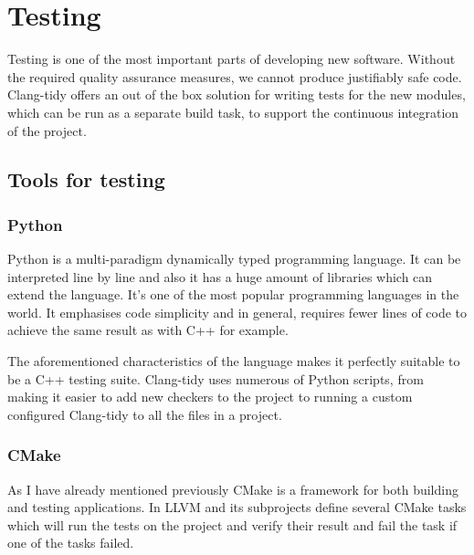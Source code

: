 \section{Testing}
\par Testing is one of the most important parts of developing new software. Without the required quality assurance measures, we cannot produce justifiably safe code. Clang-tidy offers an out of the box solution for writing tests for the new modules, which can be run as a separate build task, to support the continuous integration of the project.
\subsection{Tools for testing}
\subsubsection{Python}
\par Python is a multi-paradigm dynamically typed programming language. It can be interpreted line by line and also it has a huge amount of libraries which can extend the language. It's one of the most popular programming languages in the world. It emphasises code simplicity and in general, requires fewer lines of code to achieve the same result as with C++ for example. \medskip
\par The aforementioned characteristics of the language makes it perfectly suitable to be a C++ testing suite. Clang-tidy uses numerous of Python scripts, from making it easier to add new checkers to the project to running a custom configured Clang-tidy to all the files in a project.
\subsubsection{CMake}
\par As I have already mentioned previously CMake is a framework for both building and testing applications. In LLVM and its subprojects define several CMake tasks which will run the tests on the project and verify their result and fail the task if one of the tasks failed.
